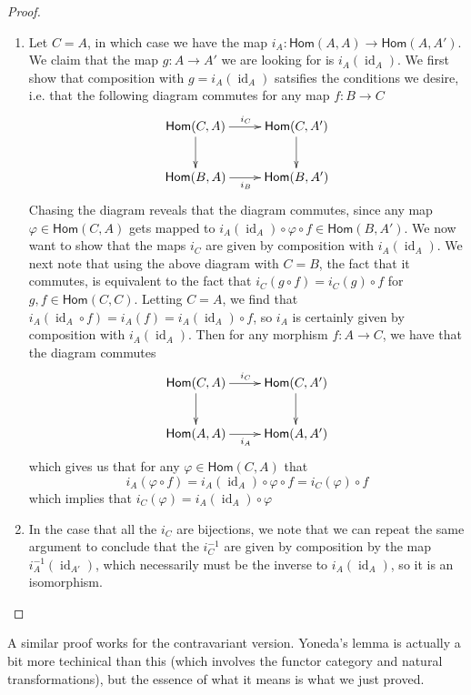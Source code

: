 \documentclass[psamsfonts]{amsart}
\theoremstyle{definition}
\theoremstyle{remark}
\renewcommand{\hom}{\mathsf{Hom}}
\newcommand{\inv}{^{-1}}
\newcommand{\enumbreak}{\ \\ \vspace{-\baselineskip}}
\DeclareMathOperator{\id}{id}
\begin{document}
\begin{proof} \enumbreak
\begin{enumerate}
\item Let $C = A$, in which case we have the map $i_A : \hom(A,A) \to \hom(A,A')$. We claim that the map $g :  A \to A'$ we are looking for is $i_A(\id_A)$. We first show that composition with $g = i_A(\id_A)$ satsifies the conditions we desire, i.e. that the following diagram commutes for any map $f: B \to C$
$$\xymatrix{
\hom(C,A) \ar[d] \ar[r]^{i_C} & \hom(C,A') \ar[d] \\
\hom(B,A) \ar[r]_{i_B} & \hom(B,A')
}$$
Chasing the diagram reveals that the diagram commutes, since any map $\varphi \in \hom(C,A)$ gets mapped to $i_A(\id_A) \circ \varphi \circ f \in \hom(B,A')$. We now want to show that the maps $i_C$ are given by composition with $i_A(\id_A)$. We next note that using the above diagram with $C = B$, the fact that it commutes, is equivalent to the fact that $i_C(g \circ f) = i_C(g) \circ f$ for $g,f \in \hom(C,C)$. Letting $C = A$, we find that $i_A(\id_A \circ f)  = i_A(f) = i_A(\id_A) \circ f$, so $i_A$ is certainly given by composition with $i_A(\id_A)$. Then for any morphism $f: A \to C$, we have that  the diagram commutes
$$\xymatrix{
\hom(C,A) \ar[d] \ar[r]^{i_C} & \hom(C,A') \ar[d] \\
\hom(A,A) \ar[r]_{i_A} & \hom(A,A')
}$$
which gives us that for any $\varphi \in \hom(C,A)$ that
$$i_A(\varphi \circ f) = i_A(\id_A) \circ \varphi \circ f = i_C(\varphi) \circ f $$
which implies that $i_C(\varphi) = i_A(\id_A) \circ \varphi$
\item In the case that all the $i_C$ are bijections, we note that we can repeat  the same argument to conclude that  the $i_C\inv$ are given by composition by the map $i_A\inv(\id_{A'})$, which necessarily must be the inverse to $i_A(\id_A)$, so it is an isomorphism.
\end{enumerate}
\end{proof}
A similar proof works for the contravariant version. Yoneda's lemma is actually a bit more techinical than this (which involves the functor category and natural transformations), but the essence of what it means is what we just proved.
\end{document}
